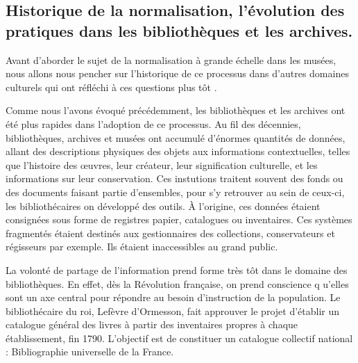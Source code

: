 \subsection{Historique de la normalisation, l’évolution des pratiques dans les bibliothèques et les archives.}

Avant d’aborder le sujet de la normalisation à grande échelle dans les musées, nous allons nous pencher sur l’historique de ce processus dans d'autres domaines culturels qui ont réfléchi à ces questions plus tôt . \newline

Comme nous l’avons évoqué précédemment, les bibliothèques et les archives ont été plus rapides dans l’adoption de ce processus. Au fil des décennies, bibliothèques, archives et musées ont accumulé d’énormes quantités de données, allant des descriptions physiques des objets aux informations contextuelles, telles que l’histoire des œuvres, leur créateur, leur signification culturelle, et les informations sur leur conservation. Ces instutions traitent souvent des fonds ou des documents faisant partie d'ensembles, pour s'y retrouver au sein de ceux-ci, les bibliothécaires on développé des outils. À l’origine, ces données étaient consignées sous forme de registres papier, catalogues ou inventaires. Ces systèmes fragmentés étaient destinés aux gestionnaires des collections, conservateurs et régisseurs par exemple. Ils étaient inaccessibles au grand public. \newline

La volonté de partage de l’information prend forme très tôt dans le domaine des bibliothèques. En effet, dès la Révolution française, on prend conscience q u'elles sont un axe central pour répondre au besoin d’instruction de la population. Le bibliothécaire du roi, Lefèvre d’Ormesson, fait approuver le projet d'établir un catalogue général des livres à partir des inventaires propres à chaque établissement, fin 1790. L’objectif est de constituer un catalogue collectif national : Bibliographie universelle de la France. \newline

